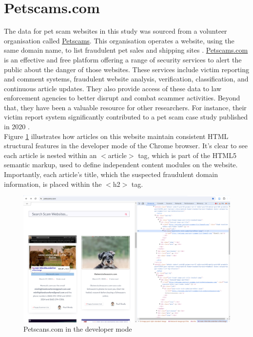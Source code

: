 \documentclass[ oneside,%
                    author={Cassie Qing Tang},
                    degree={BSc},
                     title={An Automated Response System for Disrupting Online Pet Scamming \\ },
                    subtitle={ }]{dissertation}
\begin{document}
\section{Petscams.com}
The data for pet scam websites in this study was sourced from a volunteer organisation called \href{https://www.petscams.com}{Petscams}. This organisation operates a website, using the same domain name, to list fraudulent pet sales and shipping sites \cite{brady_fighting_2024}. \href{https://www.petscams.com}{Petscams.com} is an effective and free platform offering a range of security services to alert the public about the danger of those websites. These services include victim reporting and comment systems, fraudulent website analysis, verification, classification, and continuous article updates. They also provide access of these data to law enforcement agencies to better disrupt and combat scammer activities. Beyond that, they have been a valuable resource for other researchers. For instance, their victim report system significantly contributed to a pet scam case study published in 2020 \cite{whittaker_understanding_2020}.
\\

Figure \ref{fig:pic1} illustrates how articles on this website maintain consistent HTML structural features in the developer mode of the Chrome browser. It's clear to see each article is nested within an $<$article$>$ tag, which is part of the HTML5 semantic markup, used to define independent content modules on the website. Importantly, each article's title, which the suspected fraudulent domain information, is placed within the $<$h2$>$ tag. 
\begin{figure}[H]
\centering
\includegraphics[width=0.8\linewidth,height=0.285\textheight]{pic/figure1.png}
\caption{Petscans.com in the developer mode}
\label{fig:pic1}
\end{figure}
\end{document}
